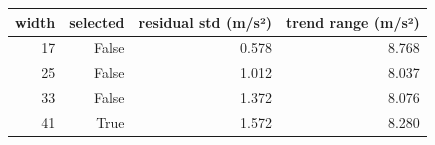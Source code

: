 \begin{tabular}{rrrr}
\toprule
width & selected & residual std (m/s²) & trend range (m/s²) \\
\midrule
17 & False & 0.578 & 8.768 \\
25 & False & 1.012 & 8.037 \\
33 & False & 1.372 & 8.076 \\
41 & True & 1.572 & 8.280 \\
\bottomrule
\end{tabular}
